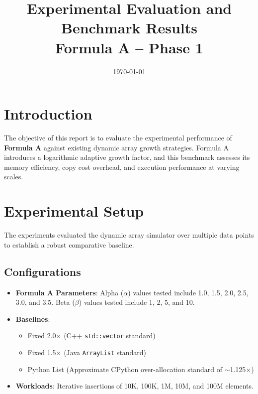 \documentclass[11pt, a4paper]{article}
\title{Experimental Evaluation and Benchmark Results \\ \Large Formula A -- Phase 1}
\author{}
\date{\today}
\begin{document}
\maketitle
\tableofcontents
\listoffigures
\listoftables
\newpage

\section{Introduction}
The objective of this report is to evaluate the experimental performance of \textbf{Formula A} against existing dynamic array growth strategies. Formula A introduces a logarithmic adaptive growth factor, and this benchmark assesses its memory efficiency, copy cost overhead, and execution performance at varying scales.

\section{Experimental Setup}
The experiments evaluated the dynamic array simulator over multiple data points to establish a robust comparative baseline. 

\subsection{Configurations}
\begin{itemize}
    \item \textbf{Formula A Parameters}: Alpha ($\alpha$) values tested include 1.0, 1.5, 2.0, 2.5, 3.0, and 3.5. Beta ($\beta$) values tested include 1, 2, 5, and 10.
    \item \textbf{Baselines}: 
    \begin{itemize}
        \item Fixed 2.0$\times$ (C++ \texttt{std::vector} standard)
        \item Fixed 1.5$\times$ (Java \texttt{ArrayList} standard)
        \item Python List (Approximate CPython over-allocation standard of $\sim$1.125$\times$)
    \end{itemize}
    \item \textbf{Workloads}: Iterative insertions of 10K, 100K, 1M, 10M, and 100M elements.
\end{itemize}
\end{document}
